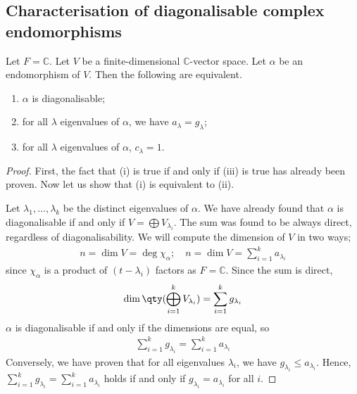 \subsection{Characterisation of diagonalisable complex endomorphisms}
\begin{lemma}[Characterisation of diagonalisable endomorphisms over $F = \mathbb{C}$]
	Let $F = \mathbb C$.
	Let $V$ be a finite-dimensional $\mathbb C$-vector space.
	Let $\alpha$ be an endomorphism of $V$.
	Then the following are equivalent.
	\begin{enumerate}
		\item $\alpha$ is diagonalisable;
		\item for all $\lambda$ eigenvalues of $\alpha$, we have $a_\lambda = g_\lambda$;
		\item for all $\lambda$ eigenvalues of $\alpha$, $c_\lambda = 1$.
	\end{enumerate}
\end{lemma}
\begin{proof}
	First, the fact that (i) is true if and only if (iii) is true has already been proven.
	Now let us show that (i) is equivalent to (ii).
	
	Let $\lambda_1, \dots, \lambda_k$ be the distinct eigenvalues of $\alpha$.
	We have already found that $\alpha$ is diagonalisable if and only if $V = \bigoplus V_{\lambda_i}$.
	The sum was found to be always direct, regardless of diagonalisability.
	We will compute the dimension of $V$ in two ways;
	\begin{align*}
		n = \dim V = \deg \chi_\alpha;\quad n = \dim V = \sum_{i=1}^k a_{\lambda_i}
	\end{align*}
	since $\chi_\alpha$ is a product of $(t-\lambda_i)$ factors as $F = \mathbb C$.
	Since the sum is direct,
	\begin{align*}
		\dim \qty(\bigoplus_{i=1}^k V_{\lambda_i}) = \sum_{i=1}^k g_{\lambda_i}
	\end{align*}
	$\alpha$ is diagonalisable if and only if the dimensions are equal, so
	\begin{align*}
		\sum_{i=1}^k g_{\lambda_i} = \sum_{i=1}^k a_{\lambda_i}
	\end{align*}
	Conversely, we have proven that for all eigenvalues $\lambda_i$, we have $g_{\lambda_i} \leq a_{\lambda_i}$.
	Hence, $\sum_{i=1}^k g_{\lambda_i} = \sum_{i=1}^k a_{\lambda_i}$ holds if and only if $g_{\lambda_i} = a_{\lambda_i}$ for all $i$.
\end{proof}